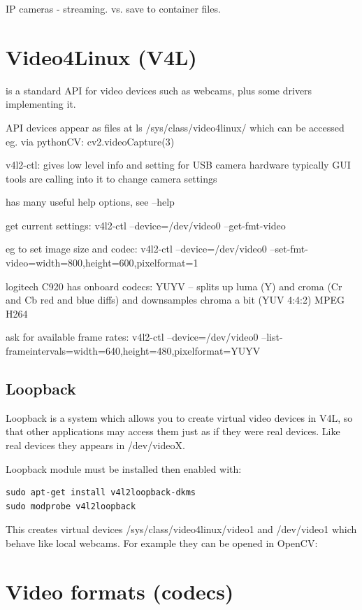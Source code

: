 \documentclass[oneside,english]{scrbook}
\begin{document}
IP cameras - streaming.  vs. save to container files.

\chapter{Video4Linux (V4L)}

is a standard API for video devices such as webcams, plus some drivers
implementing it.

API devices appear as files at ls /sys/class/video4linux/ which can
be accessed eg. via pythonCV: cv2.videoCapture(3) 

v4l2-ctl: gives low level info and setting for USB camera hardware
typically GUI tools are calling into it to change camera settings

has many useful help options, see --help 

get current settings: v4l2-ctl --device=/dev/video0 --get-fmt-video

eg to set image size and codec: v4l2-ctl --device=/dev/video0 --set-fmt-video=width=800,height=600,pixelformat=1

logitech C920 has onboard codecs: YUYV -- splits up luma (Y) and croma
(Cr and Cb red and blue diffs) and downsamples chroma a bit (YUV 4:4:2)
MPEG H264

ask for available frame rates: v4l2-ctl --device=/dev/video0 --list-frameintervals=width=640,height=480,pixelformat=YUYV


\section{Loopback}
\label{loopback}

Loopback is a system which allows you to create virtual video devices
in V4L, so that other applications may access them just as if they
were real devices. Like real devices they appears in /dev/videoX.

Loopback module must be installed then enabled with:

\begin{lstlisting}
sudo apt-get install v4l2loopback-dkms 
sudo modprobe v4l2loopback
\end{lstlisting}
This creates virtual devices /sys/class/video4linux/video1 and /dev/video1 which behave like local webcams. For example they can be opened in OpenCV:


\chapter{Video formats (codecs)}
\end{document}
